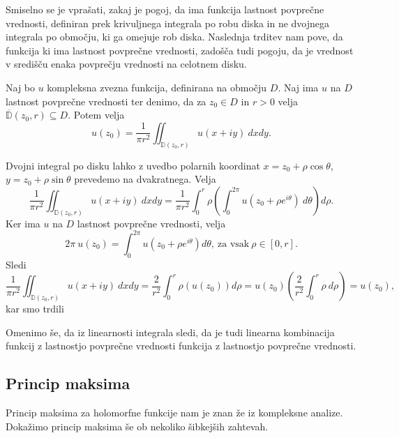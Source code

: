 \documentclass[mat1, tisk]{fmfdelo}
\begin{document}
    Smiselno se je vprašati, zakaj je pogoj, da ima funkcija lastnost povprečne vrednosti, definiran prek krivuljnega integrala po robu diska in ne dvojnega integrala po območju, ki ga omejuje rob diska.
    Naslednja trditev nam pove, da funkcija ki ima lastnost povprečne vrednosti, zadošča tudi pogoju, da je vrednost v središču enaka povprečju vrednosti na celotnem disku.

    \begin{trditev}
        Naj bo $u$ kompleksna zvezna funkcija, definirana na območju $D$. Naj ima $u$ na $D$ lastnost povprečne vrednosti ter denimo, da za $z_0 \in D$ in $r>0$ velja $\overline{\mathbb{D}}(z_0,r) \subseteq D$. Potem velja
        $$
            u(z_0) = \frac{1}{\pi r^2} \iint_{\mathbb{D}(z_0,r)}{u(x + iy)~dxdy}.
        $$
    \end{trditev}
    \begin{dokaz}
        Dvojni integral po disku lahko z uvedbo polarnih koordinat $x = z_0 + \rho \cos\theta$, $y = z_0 + \rho \sin\theta$ prevedemo na dvakratnega. Velja
        $$
        \frac{1}{\pi r^2} \iint_{\mathbb{D}(z_0,r)}{u(x + iy)~dxdy} = \frac{1}{\pi r^2} \int_{0}^{r}{\rho \left(\int_{0}^{2 \pi} u(z_0 + \rho e^{i\theta})~d\theta \right)d\rho}. 
        $$
        Ker ima $u$ na $D$ lastnost povprečne vrednosti, velja
        $$
            2 \pi~u(z_0) = \int_{0}^{2 \pi}{u\left(z_0 + \rho e^{i \theta}\right) d\theta},~\text{za vsak}~\rho \in [0, r].
        $$
        Sledi
        $$
        \frac{1}{\pi r^2} \iint_{\mathbb{D}(z_0,r)}{u(x + iy)~dxdy} = \frac{2}{r^2} \int_{0}^{r}{\rho \left(u(z_0)\right)d\rho} = u(z_0) \left(\frac{2}{r^2} \int_{0}^{r}{\rho~d\rho}\right) = u(z_0),
        $$
        kar smo trdili
    \end{dokaz}

    Omenimo še, da iz linearnosti integrala sledi, da je tudi linearna kombinacija funkcij z lastnostjo povprečne vrednosti funkcija z lastnostjo povprečne vrednosti. 

\subsection{Princip maksima}

    Princip maksima za holomorfne funkcije nam je znan že iz kompleksne analize. 
    Dokažimo princip maksima še ob nekoliko šibkejših zahtevah.
\end{document}
